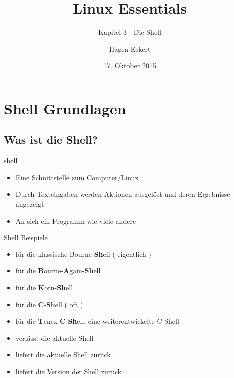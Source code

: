 \documentclass[aspectratio=43]{beamer}
\title[Linux Essentials  - Kapitel 3 - Die Shell]{Linux Essentials}
\subtitle{Kapitel 3 - Die Shell}
\author{Hagen Eckert}
\date{17. Oktober 2015}
\begin{document}
\logoframe

\frame{\titlepage}

\setcounter{tocdepth}{1}
\section[Gliederung]{}
\frame{\tableofcontents}


\section{Shell Grundlagen}
\subsection{Was ist die Shell?}
\begin{frame} 
	\begin{block}{shell} 
	\begin{itemize}
	\item Eine Schnittstelle zum Computer/Linux
	\item Durch Texteingaben werden Aktionen ausgelöst und deren Ergebnisse angezeigt
	\item An sich ein Programm wie viele andere
	\end{itemize}
	\end{block}

	


\end{frame}

\begin{frame} 

	\begin{exampleblock}{Shell Beispiele} 
	\begin{itemize}
	\item {} für die klassische Bourne-\textbf{Sh}ell ( eigentlich )
	\item {} für die \textbf{B}ourne-\textbf{A}gain-\textbf{Sh}ell 
	\item {} für die \textbf{K}orn-\textbf{Sh}ell
	\item {} für die \textbf{C}-\textbf{Sh}ell ( oft )
	\item {} für die \textbf{T}enex-\textbf{C}-\textbf{Sh}ell, eine weiterentwickelte C-Shell
	\end{itemize}
	\end{exampleblock}
	\begin{exampleblock}{}
	\begin{itemize}
	\item {} verlässt die aktuelle Shell
	\item {} liefert die aktuelle Shell zurück
	\item {} liefert die Version der Shell zurück
	\end{itemize}
	\end{exampleblock}


\end{frame}
\end{document}
